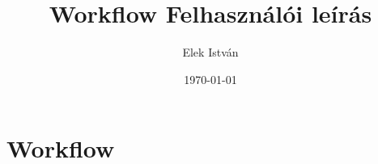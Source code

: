 \documentclass[a4paper,12pt]{article}
\begin{document}
\author{Elek István}

\title{Workflow  \linebreak  \linebreak \small Felhasználói leírás \linebreak \linebreak}


\date{\today}


\setcounter{tocdepth}{3}
\maketitle
\newpage
\tableofcontents
\newpage

\section{Workflow}
\end{document}
